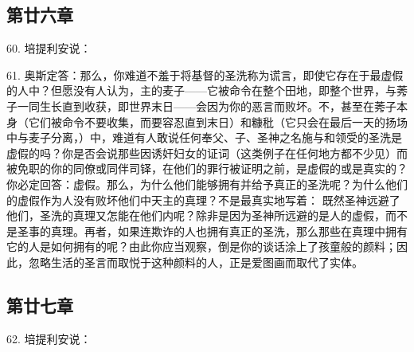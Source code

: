 
\subsection{第廿六章}

60. 培提利安说：\par

61. 奥斯定答：那么，你难道不羞于将基督的圣洗称为谎言，即使它存在于最虚假的人中？但愿没有人认为，主的麦子——它被命令在整个田地，即整个世界，与莠子一同生长直到收获，即世界末日——会因为你的恶言而败坏。不，甚至在莠子本身（它们被命令不要收集，而要容忍直到末日）和糠秕（它只会在最后一天的扬场中与麦子分离，）中，难道有人敢说任何奉父、子、圣神之名施与和领受的圣洗是虚假的吗？你是否会说那些因诱奸妇女的证词（这类例子在任何地方都不少见）而被免职的你的同僚或同伴司铎，在他们的罪行被证明之前，是虚假的或是真实的？你必定回答：虚假。那么，为什么他们能够拥有并给予真正的圣洗呢？为什么他们的虚假作为人没有败坏他们中天主的真理？不是最真实地写着： 既然圣神远避了他们，圣洗的真理又怎能在他们内呢？除非是因为圣神所远避的是人的虚假，而不是圣事的真理。再者，如果连欺诈的人也拥有真正的圣洗，那么那些在真理中拥有它的人是如何拥有的呢？由此你应当观察，倒是你的谈话涂上了孩童般的颜料；因此，忽略生活的圣言而取悦于这种颜料的人，正是爱图画而取代了实体。\par


\subsection{第廿七章}

62. 培提利安说：\par

